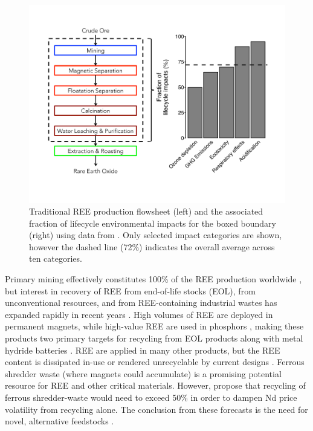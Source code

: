 \begin{figure}[htbp]
\begin{center}
\includegraphics[width = \textwidth]{Ch1_figures/Zaimes-LCA-schematic.pdf}
\caption[Traditional REE production flowsheet (left) and the associated fraction of lifecycle environmental impacts for the boxed boundary (right) using data from \citet{Zaimes_SCE_2015}.]{Traditional REE production flowsheet (left) and the associated fraction of lifecycle environmental impacts for the boxed boundary (right) using data from \citet{Zaimes_SCE_2015}.
Only selected impact categories are shown, however the dashed line (72\%) indicates the overall average across ten categories.}\label{fig:Zaimes-LCA}
\end{center}
\end{figure}

Primary mining effectively constitutes 100\% of the REE production worldwide \citep{Binnemans_JCP_2013, USGS_commsumm},
but interest in recovery of REE from end-of-life stocks (EOL), from unconventional resources, and from REE-containing industrial wastes has expanded rapidly in recent years \citep{Binnemans_JCP_2015}.
High volumes of REE are deployed in permanent magnets, while high-value REE are used in phosphors \citep{Hatch_Elem_2012},
making these products two primary targets for recycling from EOL products along with metal hydride batteries \citep{Binnemans_JCP_2013,Tunsu_Hydro_2015}.
REE are applied in many other products, but the REE content is dissipated in-use or rendered unrecyclable by current designs \citep{Ciacci_EST_2015}.
Ferrous shredder waste (where magnets could accumulate) is a promising potential resource for REE and other critical materials.
However, \citet{Bandara_JSM_2015} propose that recycling of ferrous shredder-waste would need to exceed 50\% in order to dampen Nd price volatility from recycling alone. The conclusion from these forecasts is the need for novel, alternative feedstocks \citep{Bandara_JSM_2015}.

